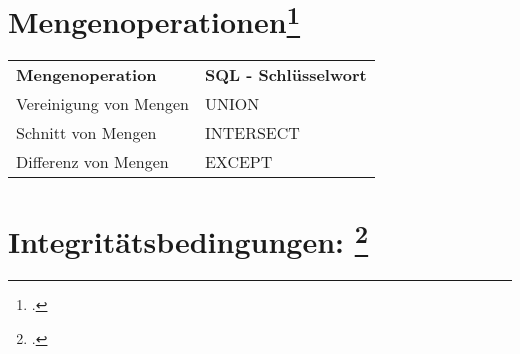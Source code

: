 \documentclass{lehramt-informatik-haupt}
\begin{document}
%

\section{Mengenoperationen\footcite[Seite 157]{winter}}

\noindent
\begin{tabular}{ll}
\textbf{Mengenoperation} &
\textbf{SQL - Schlüsselwort} \\

Vereinigung von Mengen &
UNION \\

Schnitt von Mengen &
INTERSECT \\

Differenz von Mengen &
EXCEPT \\
\end{tabular}

%

\section{Integritätsbedingungen:
\footcite[Seite 7]{db:fs:2}}
\end{document}
